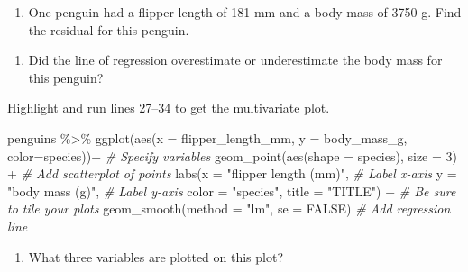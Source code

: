 \documentclass[
]{report}
\newenvironment{Shaded}{\begin{snugshade}}{\end{snugshade}}
\newcommand{\AttributeTok}[1]{\textcolor[rgb]{0.77,0.63,0.00}{#1}}
\newcommand{\CommentTok}[1]{\textcolor[rgb]{0.56,0.35,0.01}{\textit{#1}}}
\newcommand{\ConstantTok}[1]{\textcolor[rgb]{0.00,0.00,0.00}{#1}}
\newcommand{\DecValTok}[1]{\textcolor[rgb]{0.00,0.00,0.81}{#1}}
\newcommand{\FunctionTok}[1]{\textcolor[rgb]{0.00,0.00,0.00}{#1}}
\newcommand{\NormalTok}[1]{#1}
\newcommand{\SpecialCharTok}[1]{\textcolor[rgb]{0.00,0.00,0.00}{#1}}
\newcommand{\StringTok}[1]{\textcolor[rgb]{0.31,0.60,0.02}{#1}}
\providecommand{\tightlist}{%
  \setlength{\itemsep}{0pt}\setlength{\parskip}{0pt}}
\begin{document}
\vspace{.6in}

\begin{enumerate}
\def\labelenumi{\arabic{enumi}.}
\setcounter{enumi}{7}
\tightlist
\item
  One penguin had a flipper length of 181 mm and a body mass of 3750 g. Find the residual for this penguin.
\end{enumerate}

\vspace{.8in}

\begin{enumerate}
\def\labelenumi{\arabic{enumi}.}
\setcounter{enumi}{8}
\tightlist
\item
  Did the line of regression overestimate or underestimate the body mass for this penguin?
\end{enumerate}

\vspace{0.5in}

Highlight and run lines 27--34 to get the multivariate plot.

\begin{Shaded}
\begin{Highlighting}[]
\NormalTok{penguins }\SpecialCharTok{\%\textgreater{}\%}
  \FunctionTok{ggplot}\NormalTok{(}\FunctionTok{aes}\NormalTok{(}\AttributeTok{x =}\NormalTok{ flipper\_length\_mm, }\AttributeTok{y =}\NormalTok{ body\_mass\_g, }\AttributeTok{color=}\NormalTok{species))}\SpecialCharTok{+}  \CommentTok{\# Specify variables}
  \FunctionTok{geom\_point}\NormalTok{(}\FunctionTok{aes}\NormalTok{(}\AttributeTok{shape =}\NormalTok{ species), }\AttributeTok{size =} \DecValTok{3}\NormalTok{) }\SpecialCharTok{+}  \CommentTok{\# Add scatterplot of points}
  \FunctionTok{labs}\NormalTok{(}\AttributeTok{x =} \StringTok{"flipper length (mm)"}\NormalTok{,  }\CommentTok{\# Label x{-}axis}
       \AttributeTok{y =} \StringTok{"body mass (g)"}\NormalTok{,  }\CommentTok{\# Label y{-}axis}
       \AttributeTok{color =} \StringTok{"species"}\NormalTok{,}
       \AttributeTok{title =} \StringTok{"TITLE"}\NormalTok{) }\SpecialCharTok{+} \CommentTok{\# Be sure to tile your plots}
  \FunctionTok{geom\_smooth}\NormalTok{(}\AttributeTok{method =} \StringTok{"lm"}\NormalTok{, }\AttributeTok{se =} \ConstantTok{FALSE}\NormalTok{)  }\CommentTok{\# Add regression line}
\end{Highlighting}
\end{Shaded}

\begin{enumerate}
\def\labelenumi{\arabic{enumi}.}
\setcounter{enumi}{9}
\tightlist
\item
  What three variables are plotted on this plot?
\end{enumerate}
\end{document}
